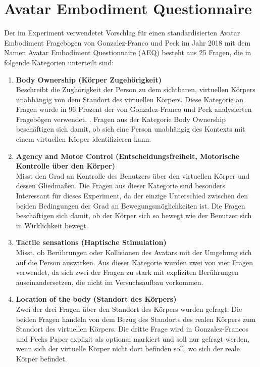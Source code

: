 \section{Avatar Embodiment Questionnaire}
Der im Experiment verwendetet Vorschlag für einen standardisierten Avatar Embodiment Fragebogen von Gonzalez-Franco und Peck im Jahr 2018 \cite{Gonzalez-Franco2018} mit dem Namen Avatar Embodiment Questionnaire (AEQ) besteht aus 25 Fragen, die in folgende Kategorien unterteilt sind:
\begin{enumerate} 

\item \textbf{Body Ownership (Körper Zugehörigkeit)}\\
Beschreibt die Zughörigkeit der Person zu dem sichtbaren, virtuellen Körpers unabhängig von dem Standort des virtuellen Körpers. Diese Kategorie an Fragen wurde in 96 Prozent der von Gonzalez-Franco und Peck analysierten Fragebögen verwendet. \cite{Gonzalez-Franco2018}. Fragen aus der Kategorie Body Ownership beschäftigen sich damit, ob sich eine Person unabhängig des Kontexts mit einem virtuellen Körper identifizieren kann.

\item\textbf{Agency and Motor Control (Entscheidungsfreiheit, Motorische Kontrolle über den Körper)}\\
Misst den Grad an Kontrolle des Benutzers über den virtuellen Körper und dessen Gliedmaßen. Die Fragen aus dieser Kategorie sind besonders Interessant für dieses Experiment, da der einzige Unterschied zwischen den beiden Bedingungen der Grad an Bewegungsmöglichkeiten ist. Die Fragen beschäftigen sich damit, ob der Körper sich so bewegt wie der Benutzer sich in Wirklichkeit bewegt.

\item\textbf{Tactile sensations (Haptische Stimulation)}\\
Misst, ob Berührungen oder Kollisionen des Avatars mit der Umgebung sich auf die Person auswirken. Aus dieser Kategorie wurden zwei von vier Fragen verwendet, da sich zwei der Fragen zu stark mit expliziten Berührungen auseinandersetzen, die nicht im Versuchsaufbau vorkommen.

\item\textbf{Location of the body (Standort des Körpers)}\\
Zwei der drei Fragen über den Standort des Körpers wurden gefragt. Die beiden Fragen handeln von dem Bezug des Standorts des realen Körpers zum Standort des virtuellen Körpers. Die dritte Frage wird in Gonzalez-Francos und Pecks Paper explizit als optional markiert und soll nur gefragt werden, wenn sich der virtuelle Körper nicht dort befinden soll, wo sich der reale Körper befindet.


\end{enumerate}
